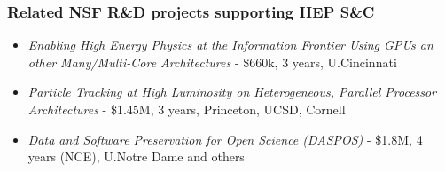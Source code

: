 \begin{frame}
\frametitle{Related NSF R\&D projects supporting HEP S\&C}

\begin{itemize}
\item {\em Enabling High Energy Physics at the Information Frontier Using GPUs an other Many/Multi-Core Architectures} - \$660k, 3 years, U.Cincinnati
\item {\em Particle Tracking at High Luminosity on Heterogeneous, Parallel Processor Architectures} - \$1.45M, 3 years, Princeton, UCSD, Cornell
\item {\em Data and Software Preservation for Open Science (DASPOS)} - \$1.8M, 4 years (NCE), U.Notre Dame and others
\end{itemize}

\end{frame}


